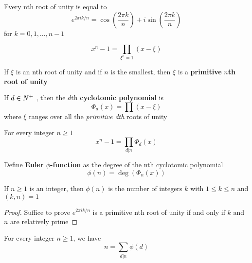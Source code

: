 \documentclass[11pt]{article}
\begin{document}
\begin{corollary}[]
Every nth root of unity is equal to
\begin{equation*}
e^{2\pi ik/n}=\cos(\frac{2\pi k}{n})+i\sin(\frac{2\pi k}{n})
\end{equation*}
for \(k=0,1,\dots,n-1\)
\end{corollary}

\begin{equation*}
x^n-1=\displaystyle\prod_{\xi^n=1}(x-\xi)
\end{equation*}

If \(\xi\) is an nth root of unity and if \(n\) is the smallest, then \(\xi\) is a
\textbf{primitive} \textbf{\(n\)th root of unity}

\begin{definition}[]
If \(d\in\relax{N}^+\) , then the \(d\)th \textbf{cyclotomic polynomial} is 
\begin{equation*}
\Phi_d(x)=\displaystyle\prod(x-\xi)
\end{equation*}
where \(\xi\) ranges over all the \emph{primitive dth} roots of unity
\end{definition}

\begin{proposition}[]
For every integer \(n\ge 1\)
\begin{equation*}
x^n-1=\displaystyle\prod_{d|n}\Phi_d(x)
\end{equation*}
\end{proposition}

\begin{definition}[]
Define \textbf{Euler \(\phi\)-function} as the degree of the nth cyclotomic
polynomial
\begin{equation*}
\phi(n)=\deg(\Phi_n(x))
\end{equation*}
\end{definition}

\begin{proposition}[]
If \(n\ge1\) is an integer, then \(\phi(n)\) is the number of integers \(k\) with
\(1\le k\le n\) and \((k,n)=1\)
\end{proposition}

\begin{proof}
Suffice to prove \(e^{2\pi ik/n}\) is a primitive nth root of unity if and only
if \(k\) and \(n\) are relatively prime
\end{proof}

\begin{corollary}[]
For every integer \(n\ge 1\), we have
\begin{equation*}
n=\displaystyle\sum_{d|n}\phi(d)
\end{equation*}
\end{corollary}
\end{document}
